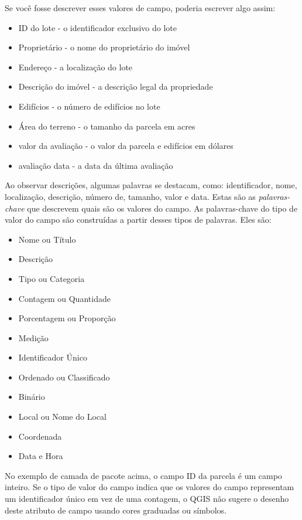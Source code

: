 \documentclass[
]{book}
\providecommand{\tightlist}{%
  \setlength{\itemsep}{0pt}\setlength{\parskip}{0pt}}
\begin{document}
Se você fosse descrever esses valores de campo, poderia escrever algo assim:

\begin{itemize}
\tightlist
\item
  ID do lote - o identificador exclusivo do lote
\item
  Proprietário - o nome do proprietário do imóvel
\item
  Endereço - a localização do lote
\item
  Descrição do imóvel - a descrição legal da propriedade
\item
  Edifícios - o número de edifícios no lote
\item
  Área do terreno - o tamanho da parcela em acres
\item
  valor da avaliação - o valor da parcela e edifícios em dólares
\item
  avaliação data - a data da última avaliação
\end{itemize}

Ao observar descrições, algumas palavras se destacam, como: identificador, nome, localização, descrição, número de, tamanho, valor e data. Estas são as \emph{palavras-chave} que descrevem quais são os valores do campo. As palavras-chave do tipo de valor do campo são construídas a partir desses tipos de palavras. Eles são:

\begin{itemize}
\tightlist
\item
  Nome ou Título
\item
  Descrição
\item
  Tipo ou Categoria
\item
  Contagem ou Quantidade
\item
  Porcentagem ou Proporção
\item
  Medição
\item
  Identificador Único
\item
  Ordenado ou Classificado
\item
  Binário
\item
  Local ou Nome do Local
\item
  Coordenada
\item
  Data e Hora
\end{itemize}

No exemplo de camada de pacote acima, o campo ID da parcela é um campo inteiro. Se o tipo de valor do campo indica que os valores do campo representam um identificador único em vez de uma contagem, o QGIS não sugere o desenho deste atributo de campo usando cores graduadas ou símbolos.
\end{document}
